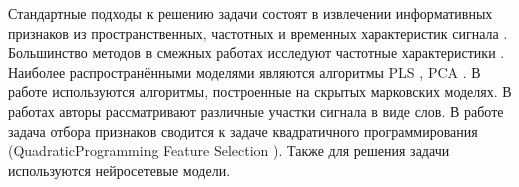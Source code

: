 \documentclass[12pt, twoside]{article}
\begin{document}
Стандартные подходы к решению задачи состоят в извлечении информативных признаков из пространственных, частотных и временных характеристик сигнала \cite{morishita2014brain, alexander2013traveling}. 
Большинство методов в смежных работах исследуют частотные характеристики \cite{chin2007identification, eliseyev2014stable, loza2017unsupervised}. Наиболее распространёнными моделями являются алгоритмы PLS \cite{eliseyev2014stable,eliseyev2016penalized, rosipal2005overview}, PCA \cite{rosipal2005overview, eliseyev2016penalized}. В работе \cite{zhao2014coupled} используются алгоритмы, построенные на скрытых марковских моделях. В работах \cite{loza2017unsupervised, zhao2010ecog} авторы рассматривают различные участки сигнала в виде слов. В работе \cite{motrenko2018multi} задача отбора признаков сводится к задаче квадратичного программирования (QuadraticProgramming Feature Selection \cite{rodriguez2010quadratic}). Также для решения задачи используются нейросетевые модели\cite{xie2018deep}. 

\newpage


\end{document}
